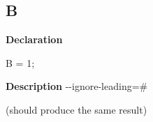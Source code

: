 \documentclass{report}
\newif\ifpdf
\begin{document}
\subsection*{B}
\fi
\label{ok_ignore_leading_hash-B}
\begin{list}{}{
\setlength{\itemindent}{0cm}
\setlength{\listparindent}{0cm}
\setlength{\leftmargin}{\evensidemargin}
\addtolength{\leftmargin}{\tmplength}
\settowidth{\labelsep}{X}
\addtolength{\leftmargin}{\labelsep}
\setlength{\labelwidth}{\tmplength}
}
\item[\textbf{Declaration}\hfill]
\ifpdf
\begin{flushleft}
\fi
\begin{ttfamily}
B = 1;\end{ttfamily}

\ifpdf
\end{flushleft}
\fi

\par
\item[\textbf{Description}]
{-}{-}ignore{-}leading={\#}

(should produce the same result)

\end{list}
\end{document}
